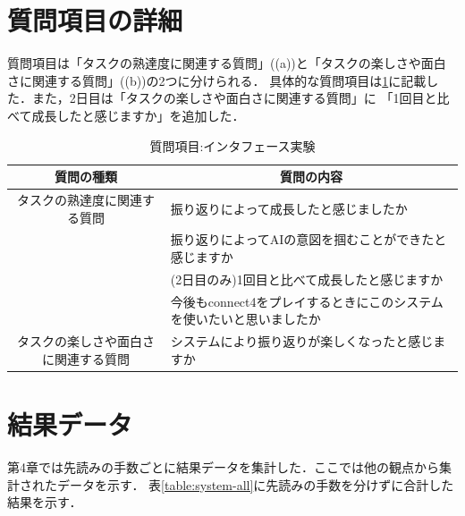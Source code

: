 \section{質問項目の詳細}
質問項目は「タスクの熟達度に関連する質問」((a))と「タスクの楽しさや面白さに関連する質問」((b))の2つに分けられる．
具体的な質問項目は\ref{table:query}に記載した．また，2日目は「タスクの楽しさや面白さに関連する質問」に
「1回目と比べて成長したと感じますか」を追加した．
\begin{table}[H]
    \caption{質問項目:インタフェース実験}
    \label{table:query}
    \centering
	\scriptsize
    \begin{tabular}{c||l}
        \multicolumn{1}{c|}{質問の種類} & \multicolumn{1}{c}{質問の内容} \\ \hline \hline
        タスクの熟達度に関連する質問 & 振り返りによって成長したと感じましたか \\
		\multicolumn{1}{c||}{}&振り返りによってAIの意図を掴むことができたと感じますか \\
		\multicolumn{1}{c||}{} & (2日目のみ)1回目と比べて成長したと感じますか\\\hline
        \multicolumn{1}{c||}{} & 今後もconnect4をプレイするときにこのシステムを使いたいと思いましたか \\
        タスクの楽しさや面白さに関連する質問 & システムにより振り返りが楽しくなったと感じますか\\
    \end{tabular}
    
\end{table}
\section{結果データ}
第4章では先読みの手数ごとに結果データを集計した．ここでは他の観点から集計されたデータを示す．
表\ref{table:system-all}に先読みの手数を分けずに合計した結果を示す．
\begin{table}[H]
    \caption{結果:総合}
    \label{table:system-all}
    \scriptsize
    \centering
    
\end{table}

